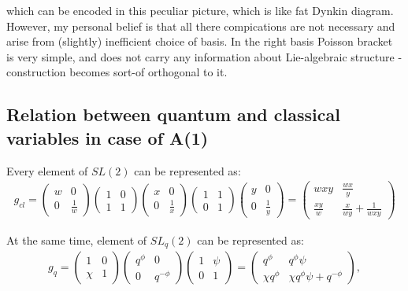 \documentclass{paper}
\def\be{\begin{eqnarray}}
\def\ee{\end{eqnarray}}
\def\lb{\left (}
\def\rb{\right )}
\begin{document}
which can be encoded in this peculiar picture, which is like fat Dynkin diagram.
However, my personal belief is that all there compications are not necessary and
arise from (slightly) inefficient choice of basis.
In the right basis Poisson bracket is very simple, and does not carry any information
about Lie-algebraic structure - construction becomes sort-of orthogonal to it.

\subsection{Relation between quantum and classical variables in case of A(1)}

Every element of $SL(2)$ can be represented as:
\be
g_{cl} = \lb \begin{array}{cc}
w & 0 \\ 0 & \frac{1}{w}
\end{array} \rb \lb \begin{array}{cc}
1 & 0 \\ 1 & 1
\end{array} \rb \lb \begin{array}{cc}
x & 0 \\ 0 & \frac{1}{x}
\end{array} \rb \lb \begin{array}{cc}
1 & 1 \\ 0 & 1
\end{array} \rb \lb \begin{array}{cc}
y & 0 \\ 0 & \frac{1}{y}
\end{array} \rb = \lb \begin{array}{cc}
wxy & \frac{wx}{y} \\ \frac{xy}{w} & \frac{x}{wy} + \frac{1}{wxy}
\end{array} \rb 
\ee

At the same time, element of $SL_q(2)$ can be represented as:
\be
g_{q} = \lb \begin{array}{cc}
1 & 0 \\ \chi & 1
\end{array} \rb \lb \begin{array}{cc}
q^\phi & 0 \\ 0 & q^{-\phi}
\end{array} \rb \lb \begin{array}{cc}
1 & \psi \\ 0 & 1
\end{array} \rb = \lb \begin{array}{cc}
q^\phi & q^\phi\psi \\ \chi q^\phi & \chi q^\phi \psi + q^{-\phi}
\end{array} \rb,
\ee
\end{document}
